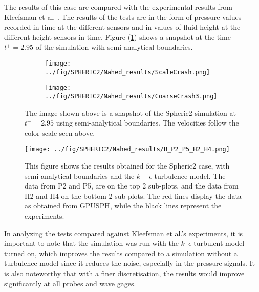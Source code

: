 \documentclass{../GPUSPHtemplate}
\begin{document}
The results of this case are compared with the experimental results from Kleefsman et al. \citep{Kleefsman}.
The results of the tests are in the form of pressure values recorded in time at the different sensors
and in values of fluid height at the different height sensors in time.
Figure (\ref{fig:Crash}) shows a snapshot at the time $t^+=2.95$ of the simulation with semi-analytical boundaries.

\begin{figure}[H]
  \begin{subfigure}[b]{0.7\linewidth}
    \centering
    \hspace*{3.3cm} \texttt{[image: ../fig/SPHERIC2/Nahed\_results/ScaleCrash.png]}
  \end{subfigure}	
  
  
  \begin{subfigure}[b]{1\linewidth}
    \centering
    \texttt{[image: ../fig/SPHERIC2/Nahed\_results/CoarseCrash3.png]} 
  \end{subfigure} 
  
  \caption{The image shown above is a snapshot of the Spheric2 simulation at $t^+ = 2.95 $ using semi-analytical boundaries.
    The velocities follow the color scale  seen above.}
  \label{fig:Crash}
\end{figure}

\begin{figure}[H]
  \centering 	
    \texttt{[image: ../fig/SPHERIC2/Nahed\_results/B\_P2\_P5\_H2\_H4.png]}
    \caption{This figure shows the results obtained for the Spheric2 case, with semi-analytical boundaries and the $k-\epsilon$ turbulence model.
      The data from P2 and P5, are on the top 2 sub-plots, and the data from H2 and H4 on the bottom 2 sub-plots.
      The red lines display the data as obtained from GPUSPH, while the black lines represent the experiments.}
\label{fig:TestpointsAll}
\end{figure}


In analyzing the tests compared against Kleefsman et al.'s experiments,
it is important to note that the simulation was run with the $k$--$\epsilon$
turbulent model turned on, which improves the results compared to a simulation without
a turbulence model since it reduces the noise, especially in the pressure signals. 
It is also noteworthy that with a finer discretisation, the results would improve significantly at all probes
and wave gages.
\end{document}
